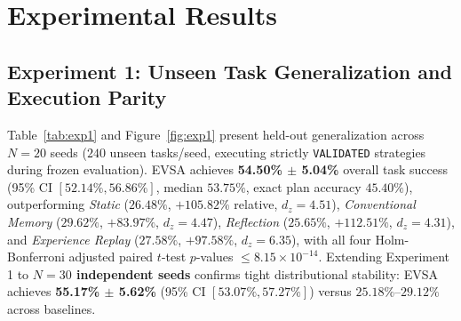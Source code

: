\documentclass[10pt,letterpaper]{article}
\begin{document}
\section{Experimental Results}
\label{sec:results}

\subsection{Experiment 1: Unseen Task Generalization and Execution Parity}
Table~\ref{tab:exp1} and Figure~\ref{fig:exp1} present held-out generalization across $N=20$ seeds ($240$ unseen tasks/seed, executing strictly \texttt{VALIDATED} strategies during frozen evaluation). EVSA achieves \textbf{54.50\% $\pm$ 5.04\%} overall task success (95\% CI $[52.14\%, 56.86\%]$, median $53.75\%$, exact plan accuracy $45.40\%$), outperforming \emph{Static} ($26.48\%$, $+105.82\%$ relative, $d_z = 4.51$), \emph{Conventional Memory} ($29.62\%$, $+83.97\%$, $d_z = 4.47$), \emph{Reflection} ($25.65\%$, $+112.51\%$, $d_z = 4.31$), and \emph{Experience Replay} ($27.58\%$, $+97.58\%$, $d_z = 6.35$), with all four Holm-Bonferroni adjusted paired $t$-test $p$-values $\le 8.15 \times 10^{-14}$. Extending Experiment 1 to \textbf{$N=30$ independent seeds} confirms tight distributional stability: EVSA achieves \textbf{55.17\% $\pm$ 5.62\%} (95\% CI $[53.07\%, 57.27\%]$) versus $25.18\%\text{--}29.12\%$ across baselines.

\begin{table}[t]
\centering
\caption{Experiment 1: Held-out unseen benchmark generalization ($N=20$ seeds, 240 tasks/seed; Mean $\pm$ SD and $[95\%\text{ CI}]$).}
\label{tab:exp1}
\end{table}
\end{document}
